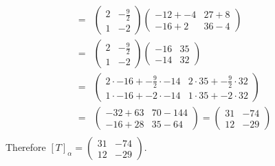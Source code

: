 \documentclass[12pt]{article}
\newenvironment{problem}[2][Problem]
{
	\begin{trivlist} 
		\item[\hskip \labelsep {\bfseries #1 #2:}]
	}
{
	\end{trivlist}
	}
\newenvironment{solution}[1][Solution]
{
	\begin{trivlist} 
		\item[\hskip \labelsep {\itshape #1:}]
	}
	{
	\end{trivlist}
}
\begin{document}
\begin{problem}{4}
\begin{solution}
\begin{align*}
=&\begin{pmatrix} 2&-\frac{9}{2}\\1&-2\end{pmatrix}\begin{pmatrix}-12 + -4& 27 + 8\\-16+2&36-4\end{pmatrix} & \\
=&\begin{pmatrix} 2&-\frac{9}{2}\\1&-2\end{pmatrix}\begin{pmatrix}-16& 35\\-14&32\end{pmatrix} & \\
=& \begin{pmatrix} 2\cdot -16 + -\frac{9}{2} \cdot -14&2\cdot 35 + -\frac{9}{2}\cdot 32\\1\cdot -16 + -2\cdot -14&1\cdot 35 +-2\cdot 32\end{pmatrix} & \\
=& \begin{pmatrix} -32 + 63&70 -144\\-16 +28&35 -64\end{pmatrix} =\begin{pmatrix} 31&-74\\12&-29\end{pmatrix}  & \\
\end{align*}
Therefore $[T]_{\alpha} = \begin{pmatrix} 31&-74\\12&-29\end{pmatrix}$.
\end{solution}
\end{problem}
\end{document}
